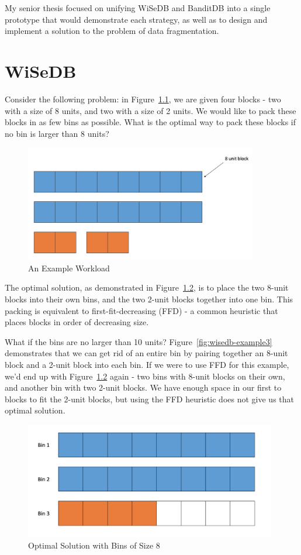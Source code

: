 \documentclass{brandiss}
\numberwithin{section}{chapter}
\numberwithin{figure}{chapter}
\theoremstyle{definition}
\theoremstyle{plain}
\theoremstyle{remark}
\begin{document}
My senior thesis focused on unifying WiSeDB and BanditDB into a single prototype that would demonstrate each strategy, as well as to design and implement a solution to the problem of data fragmentation.

\clearpage

\chapter{WiSeDB}

Consider the following problem: in Figure~\ref{fig:wisedb-example1}, we are given four blocks - two with a size of 8 units, and two with a size of 2 units. We would like to pack these blocks in as few bins as possible. What is the optimal way to pack these blocks if no bin is larger than 8 units?

\begin{figure}[htbp]
  \centering
  \includegraphics[height=2in]{wisedb-example1}
  \caption{An Example Workload}
  \label{fig:wisedb-example1}
\end{figure}

The optimal solution, as demonstrated in Figure~\ref{fig:wisedb-example2}, is to place the two 8-unit blocks into their own bins, and the two 2-unit blocks together into one bin. This packing is equivalent to first-fit-decreasing (FFD) - a common heuristic that places blocks in order of decreasing size.

What if the bins are no larger than 10 units? Figure~\ref{fig:wisedb-example3} demonstrates that we can get rid of an entire bin by pairing together an 8-unit block and a 2-unit block into each bin. If we were to use FFD for this example, we'd end up with Figure~\ref{fig:wisedb-example2} again - two bins with 8-unit blocks on their own, and another bin with two 2-unit blocks. We have enough space in our first to blocks to fit the 2-unit blocks, but using the FFD heuristic does not give us that optimal solution.

\begin{figure}[htbp]
  \centering
  \includegraphics[height=2in]{wisedb-example2}
  \caption{Optimal Solution with Bins of Size 8}
  \label{fig:wisedb-example2}
\end{figure}
\end{document}
